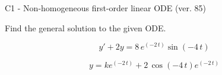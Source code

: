 \begin{exercise}
  \begin{exerciseTitle}C1 - Non-homogeneous first-order linear ODE (ver. 85)\end{exerciseTitle}
  \begin{exerciseStatement}
    
Find the general solution to the given ODE.

    
\[y'+2y= 8 \, e^{\left(-2 \, t\right)} \sin\left(-4 \, t\right)\]

  \end{exerciseStatement}
  \begin{exerciseAnswer}
    
\[y= k e^{\left(-2 \, t\right)} + 2 \, \cos\left(-4 \, t\right) e^{\left(-2 \, t\right)}\]

  \end{exerciseAnswer}
\end{exercise}